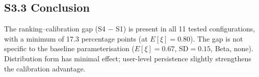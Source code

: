 \subsection*{S3.3 Conclusion}

The ranking--calibration gap (S4 $-$ S1) is present in all 11
tested configurations, with a minimum of 17.3 percentage
points (at $E[\xi]{=}0.80$). The gap is not specific to the
baseline parameterisation ($E[\xi]{=}0.67$, SD$=0.15$, Beta,
none). Distribution form has minimal effect; user-level
persistence slightly strengthens the calibration advantage.
